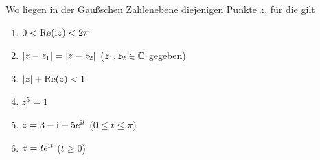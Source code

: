 \begin{exercisePage}
%
\begin{task} \label{task: 1.1}
	Wo liegen in der Gaußschen Zahlenebene diejenigen Punkte $z$, für die gilt
	\begin{enumerate}[leftmargin=*, nolistsep, topsep=-\parskip]
		\item $0 < \operatorname{Re}(\mathrm{i} z) < 2\pi$
		\item  $\left| z - z_1 \right| = \left| z - z_2 \right|$ ($z_1, z_2 \in \mathbb{C}$ gegeben)
		\item $\left| z \right| + \operatorname{Re}(z) < 1$
		\item $z^5 = 1$
		\item $z = 3 - \mathrm{i} + 5e^{\mathrm{i} t}$ ($0 \le t \le \pi$)
		\item $z = te^{\mathrm{i} t}$ ($t \ge 0$)
	\end{enumerate}
\end{task}


\end{exercisePage}
